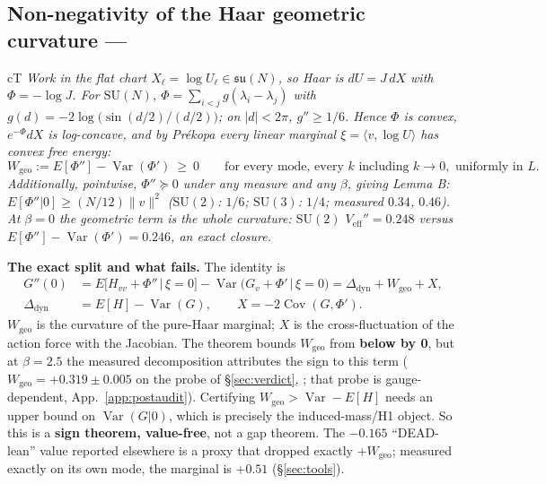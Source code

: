 \subsection{Non-negativity of the Haar geometric curvature --- \LT}
\label{sec:wgeo}


\begin{claimbox}{cT}
 \emph{Work in the flat chart
$X_\ell=\log U_\ell\in\mathfrak{su}(N)$, so Haar is $dU=J\,dX$ with $\Phi=-\log J$. For
$\mathrm{SU}(N)$, $\Phi=\sum_{i<j}g(\lambda_i-\lambda_j)$ with
$g(d)=-2\log\bigl(\sin(d/2)/(d/2)\bigr)$; on $|d|<2\pi$, $g''\ge1/6$. Hence $\Phi$ is convex,
$e^{-\Phi}dX$ is log-concave, and by Prékopa every linear marginal $\xi=\langle v,\log U\rangle$
has convex free energy:}
\begin{equation}
W_{\mathrm{geo}}:=E[\Phi'']-\operatorname{Var}(\Phi')\ \ge\ 0
\qquad\text{for every mode, every } k \text{ including } k\to0,\text{ uniformly in } L.
\label{eq:wgeo}
\end{equation}
\emph{Additionally, pointwise, $\Phi''\succeq0$ under any measure and any $\beta$, giving
Lemma B: $E[\Phi''|0]\ge(N/12)\|v\|^2$ ($\mathrm{SU}(2)$: $1/6$; $\mathrm{SU}(3)$: $1/4$;
measured $0.34$, $0.46$). At $\beta=0$ the geometric term is the whole curvature: $\mathrm{SU}(2)$
$V_{\mathrm{eff}}''=0.248$ versus $E[\Phi'']-\operatorname{Var}(\Phi')=0.246$, an exact
closure.}

\smallskip
\textbf{The exact split and what fails.} The identity is
\begin{equation}
\begin{aligned}
G''(0)&=E\bigl[H_{vv}+\Phi''\,\big|\,\xi=0\bigr]
        -\operatorname{Var}\bigl(G_v+\Phi'\,\big|\,\xi=0\bigr)
        =\Delta_{\mathrm{dyn}}+W_{\mathrm{geo}}+X,\\
\Delta_{\mathrm{dyn}}&=E[H]-\operatorname{Var}(G),\qquad
X=-2\operatorname{Cov}(G,\Phi').
\end{aligned}
\label{eq:split}
\end{equation}
$W_{\mathrm{geo}}$ is the curvature of the pure-Haar marginal; $X$ is the cross-fluctuation of
the action force with the Jacobian. The theorem bounds $W_{\mathrm{geo}}$ from \textbf{below by
0}, but at $\beta=2.5$ the measured decomposition attributes the sign to this term
($W_{\mathrm{geo}}=+0.319\pm0.005$ on the probe of \S\ref{sec:verdict}, \LE; that probe is
gauge-dependent, App.~\ref{app:postaudit}). Certifying
$W_{\mathrm{geo}}>\operatorname{Var}-E[H]$ needs an upper bound on
$\operatorname{Var}(G|0)$, which is precisely the induced-mass/H1 object. So this is a
\textbf{sign theorem, value-free}, not a gap theorem. The $-0.165$ ``DEAD-lean'' value reported
elsewhere is a proxy that dropped exactly $+W_{\mathrm{geo}}$; measured exactly on its own mode, the marginal
is $+0.51$ (\S\ref{sec:tools}).
\end{claimbox}

